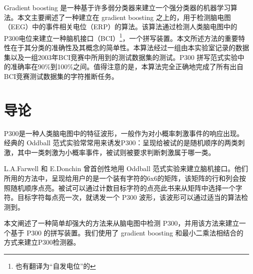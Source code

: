 \documentclass[a4paper]{ecust_translation}
\begin{document}
  \maketitle

  \begin{cAbstract}

  Gradient boosting 是一种基于许多弱分类器来建立一个强分类器的机器学习算法。本文主要阐述了一种建立在 gradient boosting 之上的，用于检测脑电图（EEG）中的事件相关电位（ERP）的算法。该算法通过检测人类脑电图中的P300电位来建立一种脑机接口（BCI）\footnote{也有翻译为{“自发电位”}的}，一个拼写装置。本文所述方法的重要特性在于其分类的准确性及其概念的简单性。本算法经过一组由本实验室记录的数据集以及一组2003年BCI竞赛中所用到的测试数据集的测试。P300 拼写范式实验中的准确率在90\%到100\%之间。值得注意的是，本算法完全正确地完成了所有出自BCI竞赛测试数据集的字符推断任务。

  \end{cAbstract}

  \wuhao
  \section{导论}
  P300是一种人类脑电图中的特征波形，一般作为对小概率刺激事件的响应出现。经典的 Oddball 范式实验常常用来诱发P300：呈现给被试的是随机顺序的两类刺激，其中一类刺激为小概率事件，被试则被要求判断刺激属于哪一类。

  L.A.Farwell 和 E.Donchin 曾首创性地用 Oddball 范式实验来建立脑机接口。他们所用的方法中，呈现给用户的是一个装有字符的6x6的矩阵，该矩阵的行和列会按照随机顺序点亮。被试可以通过计数目标字符的点亮此书来从矩阵中选择一个字符。目标字符每点亮一次，就诱发一个 P300 波形，该波形可以通过适当的算法检测到。

  本文阐述了一种简单却强大的方法来从脑电图中检测 P300，并用该方法来建立一个基于 P300 的拼写装置。我们使用了 gradient boosting 和最小二乘法相结合的方式来建立P300检测器。
\end{document}
